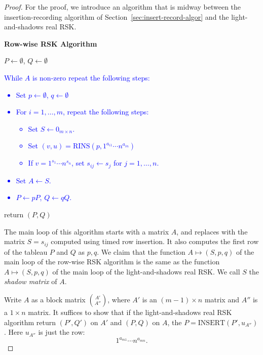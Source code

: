 \documentclass[10pt]{amsproc}
\theoremstyle{definition}
\theoremstyle{remark}
\newcommand{\rowins}{\mathrm{RINS}}
\newcommand{\ins}{\mathrm{INSERT}}
\newcommand{\ot}{\leftarrow}
\begin{document}
\begin{proof}
  For the proof, we introduce an algorithm that is midway between the insertion-recording algorithm of Section~\ref{sec:insert-record-algor} and the light-and-shadows real RSK.
  \begin{center}
    \textbf{Row-wise RSK Algorithm}
  \end{center}
  \begin{itemize}
  \item $P\ot \emptyset$, $Q\ot \emptyset$
    \textcolor{blue}{
    \item While $A$ is non-zero repeat the following steps:
      \begin{itemize}
      \item Set $p\ot \emptyset$, $q\ot \emptyset$
      \item For $i=1,\dotsc,m$, repeat the following steps:
        \begin{itemize}
        \item Set $S\ot 0_{m\times n}$.
        \item Set $(v,u)=\rowins(p,1^{a_{i1}}\dotsb n^{a_{in}})$
        \item If $v=1^{s_1}\dotsb n^{s_n}$, set $s_{ij}\ot s_j$ for $j=1,\dotsc,n$.
        \end{itemize}
      \item Set $A\ot S$.
      \item $P\ot pP$, $Q\ot qQ$.
      \end{itemize}
      }
    \item return $(P, Q)$
  \end{itemize}
  The main loop of this algorithm starts with a matrix $A$, and replaces with the matrix $S=s_{ij}$ computed using timed row insertion.
  It also computes the first row of the tableau $P$ and $Q$ as $p, q$.
  We claim that the function $A\mapsto (S, p, q)$ of the main loop of the row-wise RSK algorithm is the same as the function $A\mapsto (S, p, q)$ of the main loop of the light-and-shadows real RSK.
  We call $S$ the \emph{shadow matrix} of $A$.

  Write $A$ as a block matrix $\binom{A'}{A''}$, where $A'$ is an $(m-1)\times n$ matrix and $A''$ is a $1\times n$ matrix.
  It suffices to show that if the light-and-shadows real RSK algorithm return $(P',Q')$ on $A'$ and $(P, Q)$ on $A$, the $P=\ins(P',u_{A''})$.
  Here $u_{A''}$ is just the row:
  \begin{displaymath}
    1^{a_{m1}}\dotsb n^{a_{mn}}.
  \end{displaymath}


\end{proof}
\end{document}
